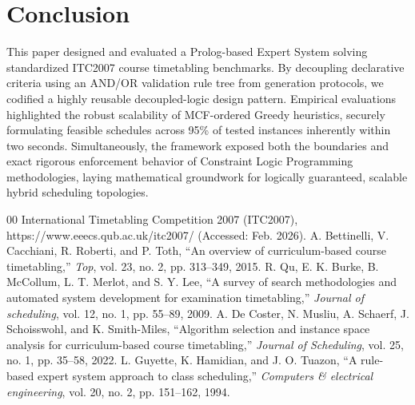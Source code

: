 \documentclass[conference]{IEEEtran}
\begin{document}
\section{Conclusion}
This paper designed and evaluated a Prolog-based Expert System solving standardized ITC2007 course timetabling benchmarks. By decoupling declarative criteria using an AND/OR validation rule tree from generation protocols, we codified a highly reusable decoupled-logic design pattern. Empirical evaluations highlighted the robust scalability of MCF-ordered Greedy heuristics, securely formulating feasible schedules across 95\% of tested instances inherently within two seconds. Simultaneously, the framework exposed both the boundaries and exact rigorous enforcement behavior of Constraint Logic Programming methodologies, laying mathematical groundwork for logically guaranteed, scalable hybrid scheduling topologies.

\begin{thebibliography}{00}
International Timetabling Competition 2007 (ITC2007), https://www.eeecs.qub.ac.uk/itc2007/ (Accessed: Feb. 2026).
A. Bettinelli, V. Cacchiani, R. Roberti, and P. Toth, ``An overview of curriculum-based course timetabling,'' \textit{Top}, vol. 23, no. 2, pp. 313--349, 2015.
R. Qu, E. K. Burke, B. McCollum, L. T. Merlot, and S. Y. Lee, ``A survey of search methodologies and automated system development for examination timetabling,'' \textit{Journal of scheduling}, vol. 12, no. 1, pp. 55--89, 2009.
A. De Coster, N. Musliu, A. Schaerf, J. Schoisswohl, and K. Smith-Miles, ``Algorithm selection and instance space analysis for curriculum-based course timetabling,'' \textit{Journal of Scheduling}, vol. 25, no. 1, pp. 35--58, 2022.
L. Guyette, K. Hamidian, and J. O. Tuazon, ``A rule-based expert system approach to class scheduling,'' \textit{Computers \& electrical engineering}, vol. 20, no. 2, pp. 151--162, 1994.
\end{thebibliography}
\end{document}
